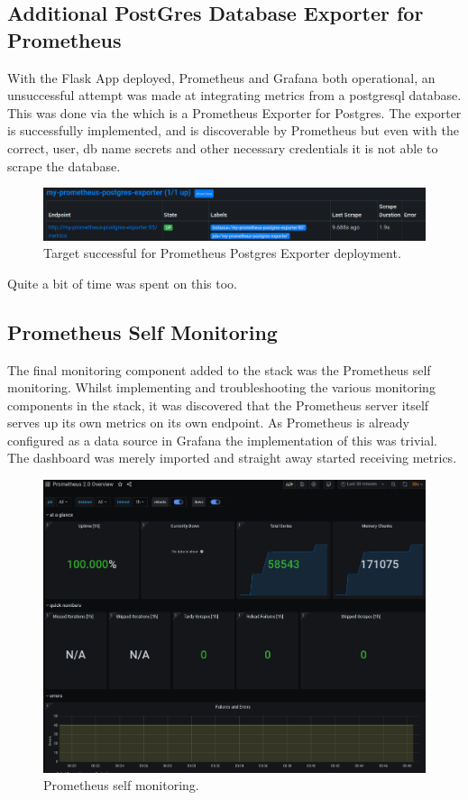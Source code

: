 \subsection{Additional PostGres Database Exporter for Prometheus}
With the Flask App deployed, Prometheus and Grafana both operational, an unsuccessful attempt was made at integrating metrics from a postgresql database.
This was done via the  which is a Prometheus Exporter for Postgres. The exporter is successfully
implemented, and is discoverable by Prometheus but even with the correct, user, db name secrets and other necessary credentials it is not
able to scrape the database. \\
\begin{figure}[H]
	\centering
	\includegraphics[width=0.8\linewidth]{figures/prom_pg_exporter_target.png}
	\caption{Target successful for Prometheus Postgres Exporter deployment.}
	\label{fig:pg_exporter_target_success}
\end{figure}
Quite a bit of time was spent on this too.

\subsection{Prometheus Self Monitoring}
The final monitoring component added to the stack was the Prometheus self monitoring. Whilst implementing and troubleshooting the
various monitoring components in the stack, it was discovered that the Prometheus server itself serves up its own metrics on
its own endpoint. As Prometheus is already configured as a data source in Grafana the implementation of this was trivial. The
dashboard was merely imported and straight away started receiving metrics.
\begin{figure}[H]
	\centering
	\includegraphics[width=0.8\linewidth]{figures/prom_self_monitor.png}
	\caption{Prometheus self monitoring.}
	\label{fig:prom_self_monitoring}
\end{figure}
